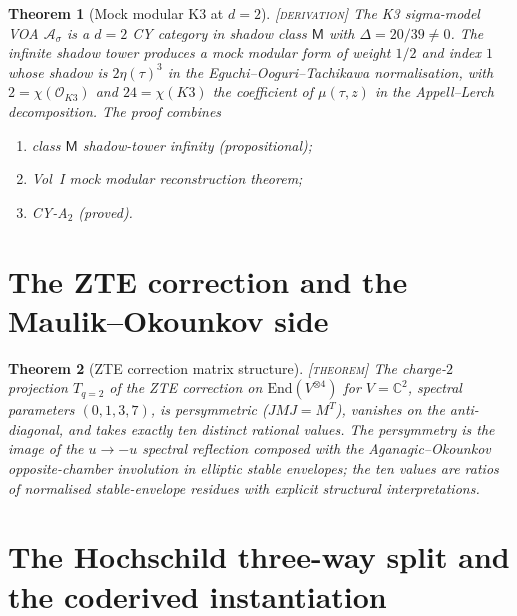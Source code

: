 \documentclass[11pt]{amsart}
\providecommand{\C}{\mathbb{C}}
\providecommand{\cA}{\mathcal{A}}
\providecommand{\cO}{\mathcal{O}}
\providecommand{\End}{\mathrm{End}}
\providecommand{\ClaimStatusTheorem}{\textsc{[theorem]}}
\providecommand{\ClaimStatusDerivation}{\textsc{[derivation]}}
\theoremstyle{plain}
\newtheorem{theorem}{Theorem}[section]
\theoremstyle{definition}
\theoremstyle{remark}
\begin{document}
\begin{theorem}[Mock modular K3 at $d=2$]
\label{thm:mock-modular-K3}
\ClaimStatusDerivation{}\;
The K3 sigma-model VOA $\cA_\sigma$ is a $d=2$ CY category in shadow
class $\mathsf{M}$ with $\Delta=20/39\ne 0$. The infinite shadow tower
produces a mock modular form of weight $1/2$ and index $1$ whose
shadow is $2\eta(\tau)^3$ in the Eguchi--Ooguri--Tachikawa
normalisation, with $2=\chi(\cO_{K3})$ and
$24=\chi(K3)$ the coefficient of $\mu(\tau,z)$ in the Appell--Lerch
decomposition. The proof combines
\begin{enumerate}
\item class $\mathsf{M}$ shadow-tower infinity (propositional);
\item Vol~I mock modular reconstruction theorem;
\item CY-A$_2$ (proved).
\end{enumerate}
\end{theorem}

\section{The ZTE correction and the Maulik--Okounkov side}

\begin{theorem}[ZTE correction matrix structure]
\label{thm:zte}
\ClaimStatusTheorem{}\;
The charge-$2$ projection $T_{q=2}$ of the ZTE correction on
$\End(V^{\otimes 4})$ for $V=\C^2$, spectral parameters
$(0,1,3,7)$, is persymmetric (\(J M J = M^T\)), vanishes on the
anti-diagonal, and takes exactly ten distinct rational values. The
persymmetry is the image of the $u\to -u$ spectral reflection
composed with the Aganagic--Okounkov opposite-chamber involution in
elliptic stable envelopes; the ten values are ratios of normalised
stable-envelope residues with explicit structural interpretations.
\end{theorem}

\section{The Hochschild three-way split and the coderived instantiation}
\end{document}
